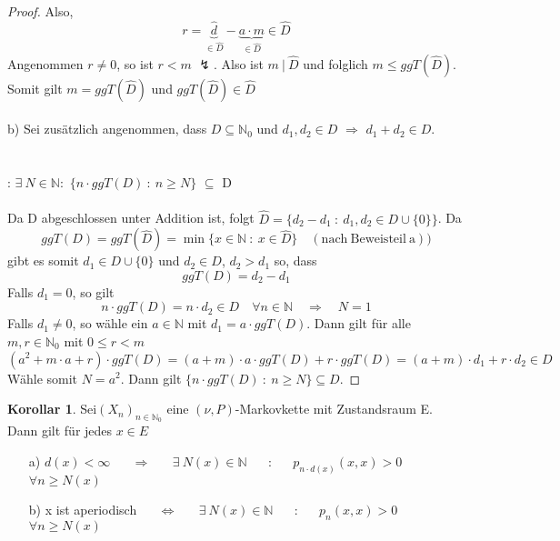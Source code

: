 \documentclass[a4paper,12pt]{scrartcl}
\theoremstyle{definition}
\newtheorem{kol}{Korollar}[section]
\begin{document}
\begin{proof}
Also,
\begin{equation*}
r = \underbrace{\hat{d}}_{\in \hat{D}} - \underbrace{a \cdot m}_{\in \hat{D}} \in \hat{D}
\end{equation*}
Angenommen $r \neq 0$, so ist $r<m$ $\lightning$. Also ist $m \: | \: \hat{D}$ und folglich $m \leq ggT(\hat{D})$. Somit gilt $m=ggT(\hat{D})$ und $ggT(\hat{D}) \in \hat{D}$
\\
\\
b) Sei zusätzlich angenommen, dass $D \subseteq \mathbb{N}_{0}$ und $d_{1}, d_{2} \in D$ $\Rightarrow$ $d_{1} + d_{2} \in D$.\\
\\
\\
: $\exists \: N \in \mathbb{N}:$ $\lbrace
 n \cdot ggT(D) \: : \: n \geq N \rbrace$ $\subseteq$ D
\\
\\
Da D abgeschlossen unter Addition ist, folgt $\hat{D} = \lbrace d_{2} - d_{1} \: : \: d_{1},d_{2} \in D \cup \lbrace 0 \rbrace \rbrace$. Da
\begin{equation*}
ggT(D) = ggT(\hat{D}) = \min \lbrace x \in \mathbb{N} \: : \: x \in \hat{D} \rbrace \quad (\mathrm{nach \: Beweisteil \: a}))
\end{equation*}
gibt es somit $d_{1} \in D \cup \lbrace 0 \rbrace$ und $d_{2} \in D$, $d_{2} > d_{1}$ so, dass
\begin{equation*}
ggT(D) = d_{2} - d_{1}
\end{equation*}
Falls $d_{1} = 0$, so gilt
\begin{equation*}
n \cdot ggT(D) = n \cdot d_{2} \in D \quad \forall n \in \mathbb{N} \quad \Rightarrow \quad N=1
\end{equation*}
Falls $d_{1} \neq 0$, so wähle ein $a \in \mathbb{N}$ mit $d_{1} = a \cdot ggT(D)$. Dann gilt für alle $m,r \in \mathbb{N}_{0}$ mit $0 \leq r < m$
\begin{equation*}
(a^{2} + m \cdot a +r)\cdot ggT(D) = (a+m)\cdot a \cdot ggT(D) + r \cdot ggT(D) = (a+m) \cdot d_{1} + r \cdot d_{2} \in D
\end{equation*}
Wähle somit $N = a^{2}$. Dann gilt $\lbrace n \cdot ggT(D) \: : \: n \geq N \rbrace \subseteq D.$ 
\end{proof}
\begin{kol}
\label{Korollar 2.6}
Sei$ (X_{n})_{n \in \mathbb{N}_{0}}$ eine $(\nu,P)$-Markovkette mit Zustandsraum E. Dann gilt für jedes $x \in E$
\begin{itemize}
\item[a)] $d(x) < \infty$ $\quad$ $\Rightarrow$ $\quad$ $\exists \: N(x) \in \mathbb{N}$ $\quad$ : $\quad$ $p_{n \cdot d(x)}(x,x)>0$ $\quad$  $\forall n \geq N(x)$
\item[b)] x ist aperiodisch $\quad$ $\Leftrightarrow$ $\quad$ $\exists \: N(x) \in \mathbb{N}$ $\quad$ : $\quad$ $p_{n}(x,x)>0$ $\quad$  $\forall n \geq N(x)$
\end{itemize}
\end{kol}
\end{document}
